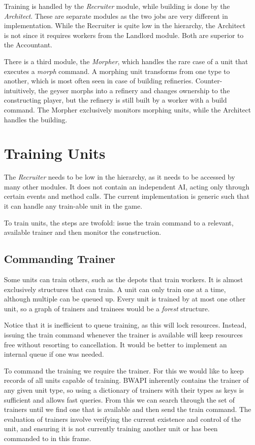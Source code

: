 Training is handled by the \emph{Recruiter} module, while building is done by the \emph{Architect}. These are separate modules as the two jobs are very different in implementation. While the Recruiter is quite low in the hierarchy, the Architect is not since it requires workers from the Landlord module. Both are superior to the Accountant.

There is a third module, the \emph{Morpher}, which handles the rare case of a unit that executes a \emph{morph} command. A morphing unit transforms from one type to another, which is most often seen in case of building refineries. Counter-intuitively, the geyser morphs into a refinery and changes ownership to the constructing player, but the refinery is still built by a worker with a build command. The Morpher exclusively monitors morphing units, while the Architect handles the building.

\section{Training Units}
The \emph{Recruiter} needs to be low in the hierarchy, as it needs to be accessed by many other modules. It does not contain an independent AI, acting only through certain events and method calls. The current implementation is generic such that it can handle any train-able unit in the game.

To train units, the steps are twofold: issue the train command to a relevant, available trainer and then monitor the construction.

	\subsection*{Commanding Trainer}
	Some units can train others, such as the depots that train workers. It is almost exclusively structures that can train. A unit can only train one at a time, although multiple can be queued up. Every unit is trained by at most one other unit, so a graph of trainers and trainees would be a \emph{forest} structure.
	
	Notice that it is inefficient to queue training, as this will lock resources. Instead, issuing the train command whenever the trainer is available will keep resources free without resorting to cancellation. It would be better to implement an internal queue if one was needed.
	
	To command the training we require the trainer. For this we would like to keep records of all units capable of training. BWAPI inherently contains the trainer of any given unit type, so using a dictionary of trainers with their types as keys is sufficient and allows fast queries. From this we can search through the set of trainers until we find one that is available and then send the train command. The evaluation of trainers involve verifying the current existence and control of the unit, and ensuring it is not currently training another unit or has been commanded to in this frame.
	
